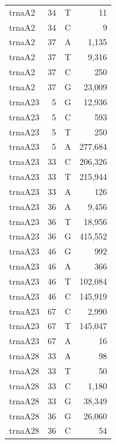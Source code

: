 \documentclass[12pt]{rockefeller}
\begin{document}
{\begin{center}
\begin{supertabular}{|l|r|c|r|}
  trnaA2 &        34 &          T &         11 \\
  trnaA2 &        34 &          C &          9 \\
  trnaA2 &        37 &          A &      1,135 \\
  trnaA2 &        37 &          T &      9,316 \\
  trnaA2 &        37 &          C &        250 \\
  trnaA2 &        37 &          G &     23,009 \\
 trnaA23 &         5 &          G &     12,936 \\
 trnaA23 &         5 &          C &        593 \\
 trnaA23 &         5 &          T &        250 \\
 trnaA23 &         5 &          A &    277,684 \\
 trnaA23 &        33 &          C &    206,326 \\
 trnaA23 &        33 &          T &    215,944 \\
 trnaA23 &        33 &          A &        126 \\
 trnaA23 &        36 &          A &      9,456 \\
 trnaA23 &        36 &          T &     18,956 \\
 trnaA23 &        36 &          G &    415,552 \\
 trnaA23 &        46 &          G &        992 \\
 trnaA23 &        46 &          A &        366 \\
 trnaA23 &        46 &          T &    102,084 \\
 trnaA23 &        46 &          C &    145,919 \\
 trnaA23 &        67 &          C &      2,990 \\
 trnaA23 &        67 &          T &    145,047 \\
 trnaA23 &        67 &          A &         16 \\
 trnaA28 &        33 &          A &         98 \\
 trnaA28 &        33 &          T &         50 \\
 trnaA28 &        33 &          C &      1,180 \\
 trnaA28 &        33 &          G &     38,349 \\
 trnaA28 &        36 &          G &     26,060 \\
 trnaA28 &        36 &          C &         54 \\

\end{supertabular}
\end{center}}
\end{document}
